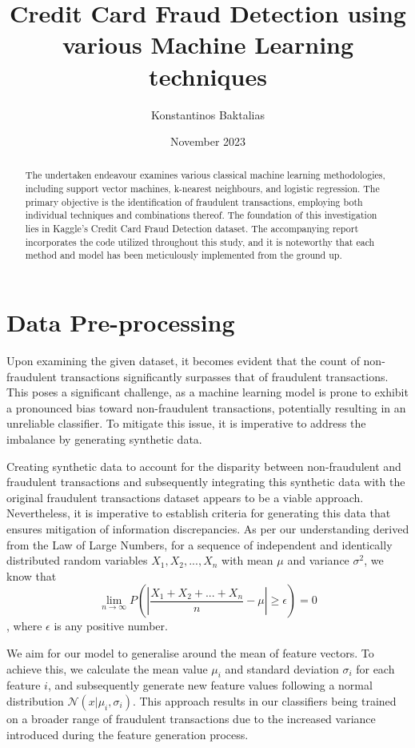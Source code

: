 \documentclass{article}
\title{Credit Card Fraud Detection using various Machine Learning techniques}
\author{Konstantinos Baktalias}
\date{November 2023}
\begin{document}
\maketitle

\begin{abstract}
    The undertaken endeavour examines various classical machine learning methodologies, including support vector machines, k-nearest neighbours, and logistic regression. The primary objective is the identification of fraudulent transactions, employing both individual techniques and combinations thereof. The foundation of this investigation lies in Kaggle's Credit Card Fraud Detection dataset. The accompanying report incorporates the code utilized throughout this study, and it is noteworthy that each method and model has been meticulously implemented from the ground up.
\end{abstract}

\section{Data Pre-processing}

Upon examining the given dataset, it becomes evident that the count of non-fraudulent transactions significantly surpasses that of fraudulent transactions. This poses a significant challenge, as a machine learning model is prone to exhibit a pronounced bias toward non-fraudulent transactions, potentially resulting in an unreliable classifier. To mitigate this issue, it is imperative to address the imbalance by generating synthetic data.

Creating synthetic data to account for the disparity between non-fraudulent and fraudulent transactions and subsequently integrating this synthetic data with the original fraudulent transactions dataset appears to be a viable approach. Nevertheless, it is imperative to establish criteria for generating this data that ensures mitigation of information discrepancies. As per our understanding derived from the Law of Large Numbers, for a sequence of independent and identically distributed random variables $X_1, X_2, ...,X_n$ with mean $\mu$ and variance $\sigma ^2$, we know that $$\lim_{n \rightarrow \infty} P(|\frac{X_1+X_2+ ...+X_n}{n} - \mu|\ge \epsilon)=0$$, where $\epsilon$ is any positive number.

We aim for our model to generalise around the mean of feature vectors. To achieve this, we calculate the mean value $\mu_i$ and standard deviation $\sigma_i$ for each feature $i$, and subsequently generate new feature values following a normal distribution $\mathcal{N}(x|\mu_i, \sigma_i)$. This approach results in our classifiers being trained on a broader range of fraudulent transactions due to the increased variance introduced during the feature generation process.
\end{document}
